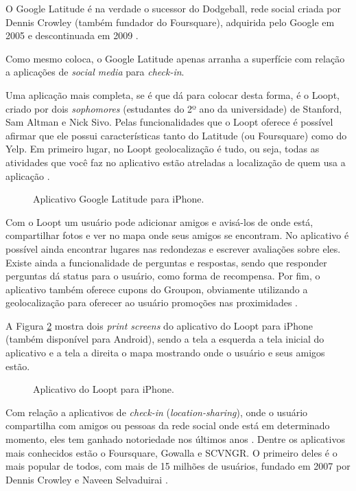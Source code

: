 \documentclass[diss]{template/setrem}
\begin{document}
O Google Latitude é na verdade o sucessor do Dodgeball, rede social criada por Dennis Crowley (também fundador do Foursquare), adquirida pelo Google em 2005 e descontinuada em 2009 \citep{Holdener2011}.

Como \citet{Holdener2011} mesmo coloca, o Google Latitude apenas arranha a superfície com relação a aplicações de \emph{social media} para \emph{check-in}.

Uma aplicação mais completa, se é que dá para colocar desta forma, é o Loopt, criado por dois \emph{sophomores} (estudantes do 2º ano da universidade) de Stanford, Sam Altman e Nick Sivo. Pelas funcionalidades que o Loopt oferece é possível afirmar que ele possui características tanto do Latitude (ou Foursquare) como do Yelp. Em primeiro lugar, no Loopt geolocalização é tudo, ou seja, todas as atividades que você faz no aplicativo estão atreladas a localização de quem usa a aplicação \cite{AppleStore2012b}.

\begin{figure}[!h]
    \caption{Aplicativo Google Latitude para iPhone.}
    \label{fig:latitude}
\end{figure}

Com o Loopt um usuário pode adicionar amigos e avisá-los de onde está, compartilhar fotos e ver no mapa onde seus amigos se encontram. No aplicativo é possível ainda encontrar lugares nas redondezas e escrever avaliações sobre eles. Existe ainda a funcionalidade de perguntas e respostas, sendo que responder perguntas dá status para o usuário, como forma de recompensa. Por fim, o aplicativo também oferece cupons do Groupon, obviamente utilizando a geolocalização para oferecer ao usuário promoções nas proximidades \cite{AppleStore2012b}.

A Figura \ref{fig:loopt} mostra dois \emph{print screens} do aplicativo do Loopt para iPhone (também disponível para Android), sendo a tela a esquerda a tela inicial do aplicativo e a tela a direita o mapa mostrando onde o usuário e seus amigos estão.

\begin{figure}[!h]
    \caption{Aplicativo do Loopt para iPhone.}
    \label{fig:loopt}
\end{figure}

Com relação a aplicativos de \emph{check-in} (\emph{location-sharing}), onde o usuário compartilha com amigos ou pessoas da rede social onde está em determinado momento, eles tem ganhado notoriedade nos últimos anos \citep{MacManus2010}. Dentre os aplicativos mais conhecidos estão o Foursquare, Gowalla e SCVNGR. O primeiro deles é o mais popular de todos, com mais de 15 milhões de usuários, fundado em 2007 por Dennis Crowley e Naveen Selvaduirai \citep{Foursquare2012}.
\end{document}
